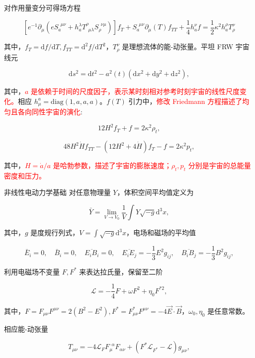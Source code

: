 \documentclass[9pt, dvipsnames]{beamer} %
\begin{document}
\begin{frame}
    对作用量变分可得场方程

    $$
    \left[e^{-1}\partial_\mu \left(e S_a^{~~\mu\nu} + h_a^\lambda T^\rho_{~~\mu\lambda} S_\rho^{~~\nu\mu} \right) \right] f_T + S_a^{~~\mu\nu} \partial_\mu(T) f_{TT} + \frac{1 }{4 } h_a^\nu f
    =\frac{1 }{2 } \kappa^2 h_a^\rho T_\rho^\nu
    $$
    
    其中，$f_T=\mathrm{d}f/\mathrm{d}T,f_{TT}=\mathrm{d}^2f/\mathrm{d}T^2$，$T_\rho^\nu$ 是理想流体的能-动张量。平坦 FRW 宇宙线元

    $$
    \mathrm{d}s^2
    =\mathrm{d}t^2 - a^2(t)\left(\mathrm{d}x^2+\mathrm{d}y^2+\mathrm{d}z^2 \right),
    $$

    其中，\textcolor{red}{$a$ 是依赖于时间的尺度因子，表示某时刻相对参考时刻宇宙的线性尺度变化。}相应 $h_\mu^a=\mathrm{diag}(1,a,a,a)$。$f(T)$ 引力中，\textcolor{red}{修改 Friedmann 方程描述了均匀且各向同性宇宙的演化}:

    $$
    \boxed{
    12 H^2 f_T + f = 2\kappa^2 \rho_t,
    }
    $$

    $$
    \boxed{
    48H^2\dot{H} f_{TT} - \left(12 H^2 + 4\dot{H} \right) f_T - f= 2\kappa^2 p_t,
    }
    $$

    其中，\textcolor{red}{$H=\dot{a}/a$ 是哈勃参数，描述了宇宙的膨胀速度；$\rho_t,p_t$ 分别是宇宙的总能量密度和压力。}
\end{frame}

\begin{frame}{非线性电动力学基础}
    对任意物理量 $Y$，体积空间平均值定义为

    $$
    \bar{Y}
    =\lim_{V\to V_0} \frac{1 }{V } \int Y\sqrt{-g} \mathrm{d}^3 x,
    $$

    其中，$g$ 是度规行列式，$\displaystyle{V=\int\sqrt{-g}\mathrm{d}^3 x } $，电场和磁场的平均值

    $$
    \bar{E}_i = 0,\quad
    \bar{B}_i = 0,\quad
    \overline{E_i B_i} = 0,\quad
    \overline{E_i E_j} = -\frac{1 }{3 } E^2 g_{ij},\quad
    \overline{B_i B_j} = -\frac{1 }{3 } B^2 g_{ij},
    $$

    利用电磁场不变量 $F,F^*$ 来表达拉氏量，保留至二阶

    $$
    \mathcal{L}=-\frac{1 }{4 } F + \omega F^2 + \eta_0 F^{*2},
    $$

    其中，$F=F_{\mu\nu} F^{\mu\nu}=2(B^2-E^2),F^*=F_{\mu\nu}^*F^{\mu\nu}=-4\vec{E}\cdot\vec{B}$，$\omega_0,\eta_0$ 是任意常数。

    相应能-动张量

    $$
    T_{\mu\nu}
    =-4\mathcal{L}_F F_\mu^{~~\alpha} F_{\alpha\nu} + \left(F^* \mathcal{L}_{F^*} - \mathcal{L} \right) g_{\mu\nu},
    $$

\end{frame}
\end{document}
